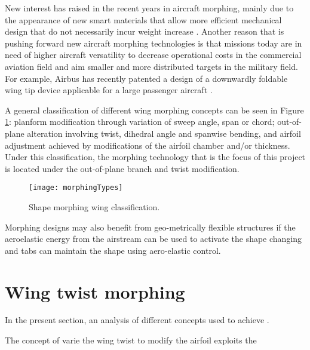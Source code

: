 New interest has raised in the recent years in aircraft morphing, mainly due to the appearance of new smart materials that allow more efficient mechanical design that do not necessarily incur weight increase \cite{Lloyd2007}. Another reason that is pushing forward new aircraft morphing technologies is that missions today are in need of higher aircraft versatility to decrease operational costs in the commercial aviation field and aim smaller and more distributed targets in the military field. For example, Airbus has recently patented a design of a downwardly foldable wing tip device applicable for a large passenger aircraft \cite{Boye2015}.

A general classification of different wing morphing concepts can be seen in Figure \ref{fig:morphingTypes}: planform modification through variation of sweep angle, span or chord; out-of-plane alteration involving twist, dihedral angle and spanwise bending, and airfoil adjustment achieved by modifications of the airfoil chamber and/or thickness. Under this classification, the morphing technology that is the focus of this project is located under the out-of-plane branch and twist modification.
 

\begin{figure}[!htpb]
  \centering
  \texttt{[image: morphingTypes]}
  \caption[Shape morphing wing classification]{Shape morphing wing classification. \cite{Barbarino2011}}\label{fig:morphingTypes}
\end{figure}

Morphing designs may also benefit from geo-metrically flexible structures if the aeroelastic energy from the airstream can be used to activate the shape changing and tabs can maintain the shape using aero-elastic control.


\section{Wing twist morphing} \label{sec:twist_state}

In the present section, an analysis of different concepts used to achieve .

The concept of varie the wing twist to modify the airfoil exploits the 
